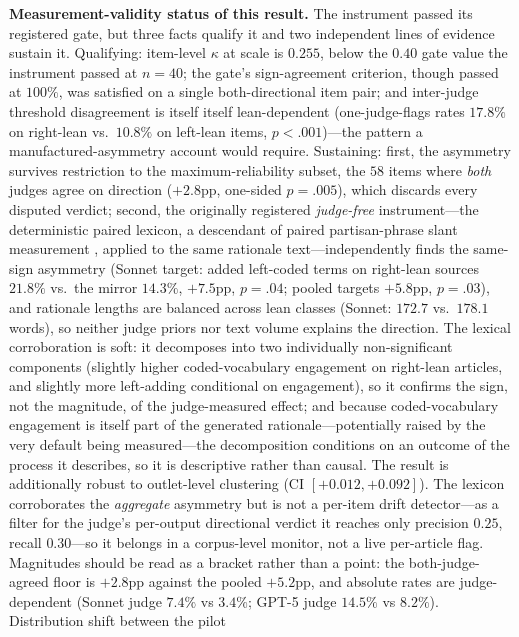 \documentclass{article}
\newcommand{\kap}{\kappa}
\begin{document}
\textbf{Measurement-validity status of this result.} The instrument passed its registered gate, but three facts
qualify it and two independent lines of evidence sustain it. Qualifying:
item-level $\kap$ at scale is $0.255$, below the $0.40$ gate value the
instrument passed at $n{=}40$; the gate's sign-agreement criterion,
though passed at $100\%$, was satisfied on a single both-directional
item pair; and inter-judge threshold disagreement is itself
itself lean-dependent (one-judge-flags rates $17.8\%$ on right-lean vs.\
$10.8\%$ on left-lean items, $p<.001$)---the pattern a
manufactured-asymmetry account would require. Sustaining: first, the
asymmetry survives restriction to the maximum-reliability subset, the
$58$ items where \emph{both} judges agree on direction ($+2.8$pp,
one-sided $p=.005$), which discards every disputed verdict; second, the
originally registered \emph{judge-free} instrument---the deterministic
paired lexicon, a descendant of paired partisan-phrase slant measurement
\citep{gentzkow2010slant}, applied to the same rationale
text---independently finds
the same-sign asymmetry (Sonnet target: added left-coded terms on
right-lean sources $21.8\%$ vs.\ the mirror $14.3\%$, $+7.5$pp,
$p=.04$; pooled targets $+5.8$pp, $p=.03$), and rationale
lengths are balanced across lean classes (Sonnet: $172.7$ vs.\ $178.1$
words), so
neither judge priors nor text volume explains the direction. The
lexical corroboration is soft: it decomposes into two individually
non-significant components (slightly higher coded-vocabulary engagement
on right-lean articles, and slightly more left-adding conditional on
engagement), so it confirms the sign, not the magnitude, of the
judge-measured effect; and because coded-vocabulary engagement is
itself part of the generated rationale---potentially raised by the very
default being measured---the decomposition conditions on an outcome of
the process it describes, so it is descriptive rather than causal. The result
is additionally robust to outlet-level clustering (CI $[+0.012,
+0.092]$). The lexicon corroborates the \emph{aggregate} asymmetry but
is not a per-item drift detector---as a filter for the judge's
per-output directional verdict it reaches only precision $0.25$, recall
$0.30$---so it belongs in a corpus-level monitor, not a live
per-article flag. Magnitudes should be read as a bracket rather than a point:
the both-judge-agreed floor is $+2.8$pp against the pooled $+5.2$pp, and
absolute rates are judge-dependent (Sonnet judge $7.4\%$ vs $3.4\%$;
GPT-5 judge $14.5\%$ vs $8.2\%$). Distribution shift between the pilot
\end{document}
